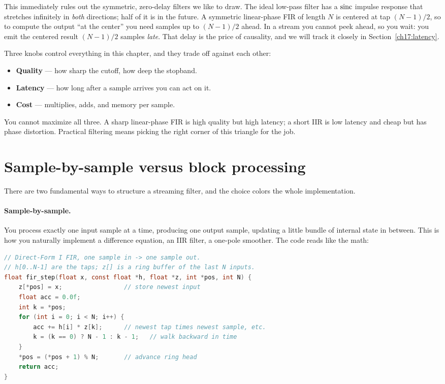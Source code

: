This immediately rules out the symmetric, zero-delay filters we like to draw.
The ideal low-pass filter has a $\operatorname{sinc}$ impulse response that stretches
infinitely in \emph{both} directions; half of it is in the future. A symmetric
linear-phase FIR of length $N$ is centered at tap $(N-1)/2$, so to compute the
output ``at the center'' you need samples up to $(N-1)/2$ ahead. In a stream you
cannot peek ahead, so you wait: you emit the centered result $(N-1)/2$
samples \emph{late}. That delay is the price of causality, and we will track it
closely in Section~\ref{ch17:latency}.

\begin{focusbox}
Three knobs control everything in this chapter, and they trade off against each
other:
\begin{itemize}
  \item \textbf{Quality} --- how sharp the cutoff, how deep the stopband.
  \item \textbf{Latency} --- how long after a sample arrives you can act on it.
  \item \textbf{Cost} --- multiplies, adds, and memory per sample.
\end{itemize}
You cannot maximize all three. A sharp linear-phase FIR is high quality but
high latency; a short IIR is low latency and cheap but has phase distortion. Practical
filtering means picking the right corner of this triangle for the
job.
\end{focusbox}

\section{Sample-by-sample versus block processing}
\label{ch17:sample-vs-block}

There are two fundamental ways to structure a streaming filter, and the choice
colors the whole implementation.

\paragraph{Sample-by-sample.} You process exactly one input sample at a time,
producing one output sample, updating a little bundle of internal state in
between. This is how you naturally implement a difference equation, an IIR
filter, a one-pole smoother. The code reads like the math:

\begin{lstlisting}[language=C]
// Direct-Form I FIR, one sample in -> one sample out.
// h[0..N-1] are the taps; z[] is a ring buffer of the last N inputs.
float fir_step(float x, const float *h, float *z, int *pos, int N) {
    z[*pos] = x;                 // store newest input
    float acc = 0.0f;
    int k = *pos;
    for (int i = 0; i < N; i++) {
        acc += h[i] * z[k];      // newest tap times newest sample, etc.
        k = (k == 0) ? N - 1 : k - 1;   // walk backward in time
    }
    *pos = (*pos + 1) % N;       // advance ring head
    return acc;
}
\end{lstlisting}

